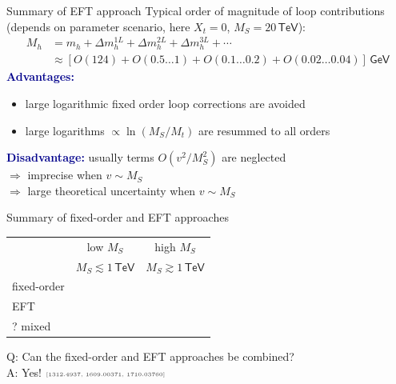 \documentclass[hyperref={pdfpagelabels=false},ngerman]{beamer}
\newcommand{\cmark}{\ding{51}}%
\newcommand{\xmark}{\ding{55}}%
\newcommand{\eh}[1]{\,\mathsf{#1}}
\newcommand{\ok}{\textcolor{darkgreen}{\cmark}}
\newcommand{\notok}{\textcolor{red}{\xmark}}
\newcommand{\MS}{\ensuremath{M_S}}
\newcommand{\mycite}[1]{\ensuremath{\text{\textcolor{darkgray}{\tiny [#1]}}}}
\renewcommand{\emph}[1]{\textbf{\textcolor{darkblue}{#1}}}
\begin{document}
\begin{frame}{Summary of EFT approach}
  Typical order of magnitude of loop contributions (depends on
  parameter scenario, here $X_t = 0$, $\MS = 20\eh{TeV}$):
  \begin{align*}
    M_h &= m_h + \Delta m_h^{1L} + \Delta m_h^{2L} + \Delta m_h^{3L} + \cdots \\
    &\approx [O(124) + O(0.5\ldots 1) + O(0.1\ldots 0.2) + O(0.02\ldots 0.04)] \eh{GeV}
  \end{align*}
  \emph{Advantages:}
  \begin{itemize}
  \item large logarithmic fixed order loop corrections are avoided
  \item large logarithms $\propto\ln(M_S/M_t)$ are resummed to all orders
  \end{itemize}
  \emph{Disadvantage:} usually terms $O(v^2/M_S^2)$ are neglected \\
  $\Rightarrow$ imprecise when $v \sim \MS$ \\
  $\Rightarrow$ large theoretical uncertainty when $v \sim \MS$
\end{frame}

\begin{frame}{Summary of fixed-order and EFT approaches}
  \begin{center}
    \begin{tabular}{lcc}
      \toprule
                  & low $\MS$ & high $\MS$ \\
                  & $\MS \lesssim 1\eh{TeV}$ & $\MS \gtrsim 1\eh{TeV}$ \\
      \midrule
      fixed-order & \ok       & \notok     \\
      EFT         & \notok    & \ok        \\
      ? mixed     & \ok       & \ok        \\
      \bottomrule
    \end{tabular}
  \end{center}
  \vspace{2em}
  Q: Can the fixed-order and EFT approaches be combined? \\[1em]
  A: Yes!  \mycite{1312.4937, 1609.00371, 1710.03760}
\end{frame}
\end{document}
